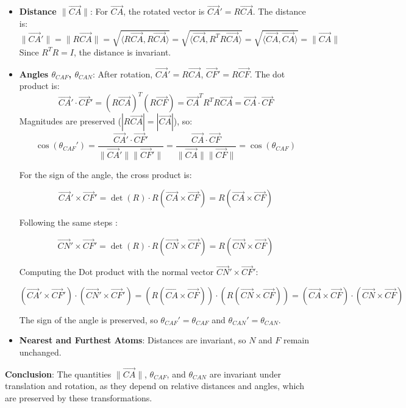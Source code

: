 \documentclass{article}
\begin{document}
\begin{itemize}
  \item \textbf{Distance \( \|{\vec{CA}}\| \)}: For \( \vec{CA} \), the rotated vector is \( \vec{CA}' = R \vec{CA} \). The distance is:
    \[
    \| \vec{CA}' \| = \|R \vec{CA}\| = \sqrt{ \langle R \vec{CA}, R \vec{CA} \rangle } = \sqrt{ \langle \vec{CA}, R^T R \vec{CA} \rangle } = \sqrt{ \langle \vec{CA}, \vec{CA} \rangle } = \| \vec{CA} \|
    \]
    Since \( R^T R = I \), the distance is invariant.

  \item \textbf{Angles \( \theta_{CAF} \), \( \theta_{CAN} \)}: After rotation, \( \vec{CA}' = R \vec{CA} \), \( \vec{CF}' = R \vec{CF} \). The dot product is:
    \[
    \vec{CA}' \cdot \vec{CF}' = (R \vec{CA})^T (R \vec{CF}) = \vec{CA}^T R^T R \vec{CA} = \vec{CA} \cdot \vec{CF}
    \]
    Magnitudes are preserved (\( |R \vec{CA}| = |\vec{CA}| \)), so:
    \[
    \cos(\theta_{CAF}') = \frac{\vec{CA}' \cdot \vec{CF}'}{\|\vec{CA}'\| \|\vec{CF}'\|} = \frac{\vec{CA} \cdot \vec{CF}}{\|\vec{CA}\| \|\vec{CF}\|} = \cos(\theta_{CAF})
    \]

      For the sign of the angle, the cross product is:

      $$
      \vec{CA}' \times \vec{CF}' = \det(R) \cdot R( \vec{CA} \times  \vec{CF}) = R (\vec{CA} \times \vec{CF})
      $$

      Following the same steps : 

      $$
      \vec{CN}' \times \vec{CF}' = \det(R) \cdot R( \vec{CN} \times  \vec{CF}) = R (\vec{CN} \times \vec{CF})
      $$


        Computing the Dot product with the normal vector \(\vec{CN}' \times \vec{CF}'  \):

      $$
      (\vec{CA}' \times \vec{CF}') \cdot (\vec{CN}' \times \vec{CF}') = (R (\vec{CA} \times \vec{CF})) \cdot (R (\vec{CN} \times \vec{CF})) = (\vec{CA} \times \vec{CF}) \cdot (\vec{CN} \times \vec{CF})
      $$
     
     
      The sign of the angle is preserved, so \( \theta_{CAF}' = \theta_{CAF} \) and \( \theta_{CAN}' = \theta_{CAN} \). \newline
  \item \textbf{Nearest and Furthest Atoms}: Distances are invariant, so \( N \) and \( F \) remain unchanged. \newline
\end{itemize}

\textbf{Conclusion}: The quantities \( \|\vec{CA}\| \), \( \theta_{CAF} \), and \( \theta_{CAN} \) are invariant under translation and rotation, as they depend on relative distances and angles, which are preserved by these transformations.
\end{document}
